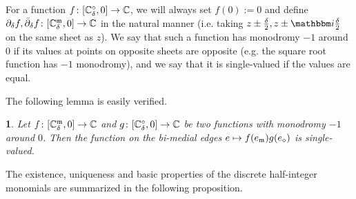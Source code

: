 \documentclass[12pt,oneside,english]{amsart}
\numberwithin{equation}{section}
\numberwithin{figure}{section}
\theoremstyle{plain}
\theoremstyle{plain}
\theoremstyle{plain}
\theoremstyle{plain}
\newtheorem{lem}[thm]{\protect\lemmaname}
\theoremstyle{remark}
\theoremstyle{definition}
\theoremstyle{plain}
\theoremstyle{plain}
\numberwithin{thm}{section}
\providecommand{\lemmaname}{Lemma}
\providecommand{\lemmaname}{Lemma}
\providecommand{\lemmaname}{Lemma}
\providecommand{\lemmaname}{Lemma}
\begin{document}
For a function $f \colon  {\left[ {\mathbb{C}_{{\delta}}^{\diamond}}, 0 \right]} \to  \mathbb{C} $,
we will always set $f(0) := 0$ and define 
${\partial}_{{\delta}} f, {{\bar{\partial}}}_{{\delta}} f
 \colon  {\left[ {\mathbb{C}_{{\delta}}^{\mathfrak{m}}}, 0 \right]} \to  \mathbb{C} $
in the natural manner (i.e. taking
$z\pm\frac{ \meshsz }{2},z\pm \ii \frac{ \meshsz }{2}$
on the same sheet as $z$). We say that such a function has monodromy
$-1$ around $0$ if its values at points on opposite sheets are opposite
(e.g. the square root function has $-1$ monodromy), and we say that
it is single-valued if the values are equal. 

The following lemma is easily verified.
\begin{lem}
\label{lem:product-two-double-valued-functions}Let 
$f \colon  {\left[  {\mathbb{C}_{{\delta}}^{\mathfrak{m}}}, 0 \right]} \to \mathbb{C}$
and $g \colon  {\left[ {\mathbb{C}_{{\delta}}^{\diamond}}, 0 \right]} \to \mathbb{C}$
be two functions with monodromy $-1$ around $0$. Then the function
on the bi-medial edges $e\mapsto 
f(e_{\mathfrak{m}})g(e_{\diamond})$
is single-valued.
\end{lem}
The existence, uniqueness and basic properties of the discrete half-integer
monomials are summarized in the following proposition. 
\end{document}
